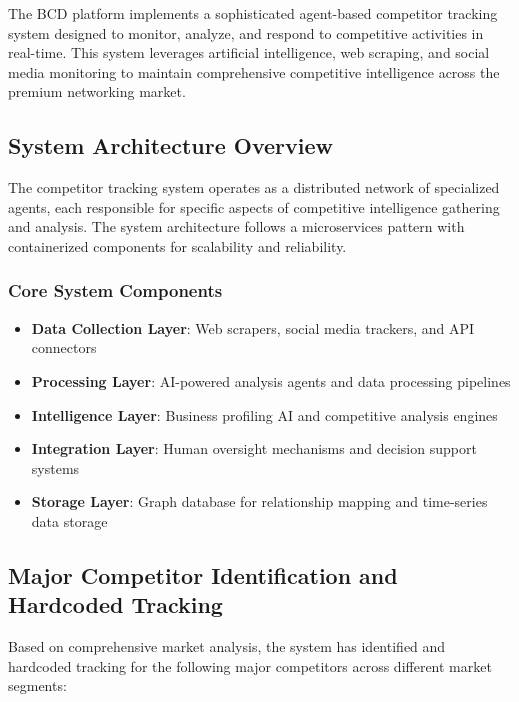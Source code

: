 The BCD platform implements a sophisticated agent-based competitor tracking system designed to monitor, analyze, and respond to competitive activities in real-time. This system leverages artificial intelligence, web scraping, and social media monitoring to maintain comprehensive competitive intelligence across the premium networking market.

\subsection{System Architecture Overview}

The competitor tracking system operates as a distributed network of specialized agents, each responsible for specific aspects of competitive intelligence gathering and analysis. The system architecture follows a microservices pattern with containerized components for scalability and reliability.

\subsubsection{Core System Components}

\begin{itemize}
    \item \textbf{Data Collection Layer}: Web scrapers, social media trackers, and API connectors
    \item \textbf{Processing Layer}: AI-powered analysis agents and data processing pipelines
    \item \textbf{Intelligence Layer}: Business profiling AI and competitive analysis engines
    \item \textbf{Integration Layer}: Human oversight mechanisms and decision support systems
    \item \textbf{Storage Layer}: Graph database for relationship mapping and time-series data storage
\end{itemize}

\subsection{Major Competitor Identification and Hardcoded Tracking}

Based on comprehensive market analysis, the system has identified and hardcoded tracking for the following major competitors across different market segments:

